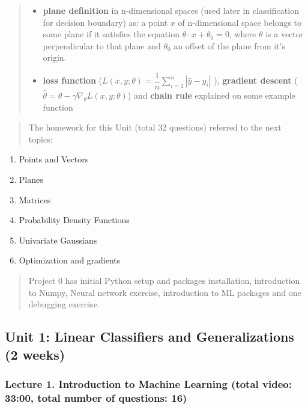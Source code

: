 \documentclass[]{article}
\providecommand{\tightlist}{%
  \setlength{\itemsep}{0pt}\setlength{\parskip}{0pt}}
\begin{document}
\begin{quote}
\begin{itemize}
\tightlist
\item
  \textbf{plane definition} in n-dimensional spaces (used later in
  classification for decision boundary) as: a point \(x\) of
  n-dimensional space belongs to some plane if it satisfies the equation
  \(\theta \cdot x + \theta_{0} = 0\), where \(\theta\) is a vector
  perpendicular to that plane and \(\theta_{0}\) an offset of the plane
  from it's origin.
\item
  \textbf{loss function}
  (\(L(x, y; \theta) = \dfrac{1}{n} \sum_{i = 1}^{n} | \hat{y} - y_{i}|\)
  ), \textbf{gradient descent}
  (\(\hat{\theta} = \theta - \gamma \nabla_{\theta} L(x, y; \theta)\))
  and \textbf{chain rule} explained on some example function
\end{itemize}
\end{quote}

\begin{quote}
The homework for this Unit (total 32 questions) referred to the next
topics:
\end{quote}

\begin{enumerate}
\def\labelenumi{\arabic{enumi}.}
\tightlist
\item
  Points and Vectors
\item
  Planes
\item
  Matrices
\item
  Probability Density Functions
\item
  Univariate Gaussians
\item
  Optimization and gradients
\end{enumerate}

\begin{quote}
Project 0 has initial Python setup and packages installation,
introduction to Numpy, Neural network exercise, introduction to ML
packages and one debugging exercise.
\end{quote}

\hypertarget{unit-1-linear-classifiers-and-generalizations-2-weeks}{%
\subsection{Unit 1: Linear Classifiers and Generalizations (2
weeks)}\label{unit-1-linear-classifiers-and-generalizations-2-weeks}}

\hypertarget{lecture-1.-introduction-to-machine-learning-total-video-3300-total-number-of-questions-16}{%
\subsubsection{Lecture 1. Introduction to Machine Learning (total video:
33:00, total number of questions:
16)}\label{lecture-1.-introduction-to-machine-learning-total-video-3300-total-number-of-questions-16}}
\end{document}
